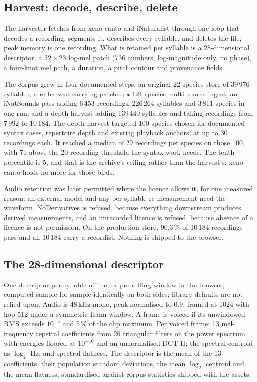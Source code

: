 \documentclass[10pt,twocolumn,a4paper]{article}
\begin{document}
\subsection{Harvest: decode, describe, delete}

The harvester fetches from xeno-canto and iNaturalist through one loop that decodes a
recording, segments it, describes every syllable, and deletes the file; peak memory is one
recording. What is retained per syllable is a 28-dimensional descriptor, a
$32 \times 23$ log-mel patch (736 numbers, log-magnitude only, no phase), a four-knot
mel path, a duration, a pitch contour and provenance fields.

The corpus grew in four documented steps: an original 22-species store of 39\,976
syllables; a re-harvest carrying patches; a 121-species multi-source ingest; an
iNatSounds pass adding 6\,453 recordings, 226\,264 syllables and 3\,811 species in one run;
and a depth harvest adding 139\,440 syllables and taking recordings from 7\,992 to 10\,184.
The depth harvest targeted 100 species chosen for documented syntax cases, repertoire depth
and existing playback anchors, at up to 30 recordings each. It reached a median of 29
recordings per species on those 100, with 71 above the 20-recording threshold the syntax
work needs. The tenth percentile is 5, and that is the archive's ceiling rather than the
harvest's: xeno-canto holds no more for those birds.

Audio retention was later permitted where the licence allows it, for one measured reason:
an external model and any per-syllable re-measurement need the waveform. NoDerivatives is
refused, because everything downstream produces derived measurements, and an unrecorded
licence is refused, because absence of a licence is not permission. On the production store,
90.3\,\% of 10\,184 recordings pass and all 10\,184 carry a recordist. Nothing is shipped to
the browser.

\subsection{The 28-dimensional descriptor}

One descriptor per syllable offline, or per rolling window in the browser, computed
sample-for-sample identically on both sides; library defaults are not relied upon. Audio is
48\,kHz mono, peak-normalised to 0.9, framed at 1024 with hop 512 under a symmetric Hann
window. A frame is voiced if its unwindowed RMS exceeds $10^{-4}$ and 5\,\% of the clip
maximum. Per voiced frame: 13 mel-frequency cepstral coefficients from 26 triangular
filters on the power spectrum with energies floored at $10^{-10}$ and an unnormalised
DCT-II; the spectral centroid as $\log_2$ Hz; and spectral flatness. The descriptor is the
mean of the 13 coefficients, their population standard deviations, the mean $\log_2$
centroid and the mean flatness, standardised against corpus statistics shipped with the
assets.
\end{document}
